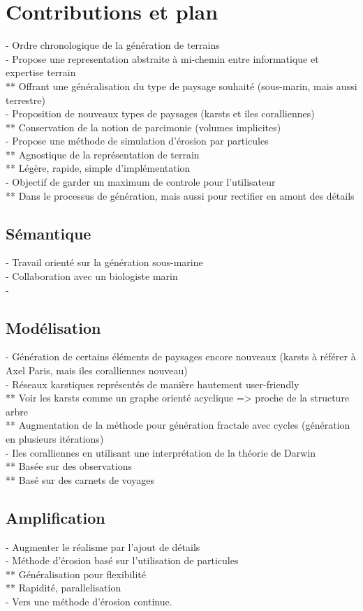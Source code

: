 \section{Contributions et plan}
\label{sec:introduction_contribution-plan}
- Ordre chronologique de la génération de terrains \\
- Propose une representation abstraite à mi-chemin entre informatique et expertise terrain \\
** Offrant une généralisation du type de paysage souhaité (sous-marin, mais aussi terrestre) \\
- Proposition de nouveaux types de paysages (karsts et iles coralliennes) \\
** Conservation de la notion de parcimonie (volumes implicites) \\
- Propose une méthode de simulation d'érosion par particules \\
** Agnostique de la représentation de terrain \\
** Légère, rapide, simple d'implémentation \\
- Objectif de garder un maximum de controle pour l'utilisateur \\ 
** Dans le processus de génération, mais aussi pour rectifier en amont des détails

\subsection{Sémantique}
- Travail orienté sur la génération sous-marine \\
- Collaboration avec un biologiste marin \\
- 

\subsection{Modélisation}
- Génération de certains éléments de paysages encore nouveaux (karsts à référer à Axel Paris, mais iles coralliennes nouveau) \\
- Réseaux karstiques représentés de manière hautement user-friendly \\
** Voir les karsts comme un graphe orienté acyclique => proche de la structure arbre \\
** Augmentation de la méthode pour génération fractale avec cycles (génération en plusieurs itérations) \\
- Iles coralliennes en utilisant une interprétation de la théorie de Darwin \\
** Basée sur des observations \\
** Basé sur des carnets de voyages

\subsection{Amplification}
- Augmenter le réalisme par l'ajout de détails \\
- Méthode d'érosion basé sur l'utilisation de particules \\
** Généralisation pour flexibilité \\
** Rapidité, parallelisation \\
- Vers une méthode d'érosion continue.